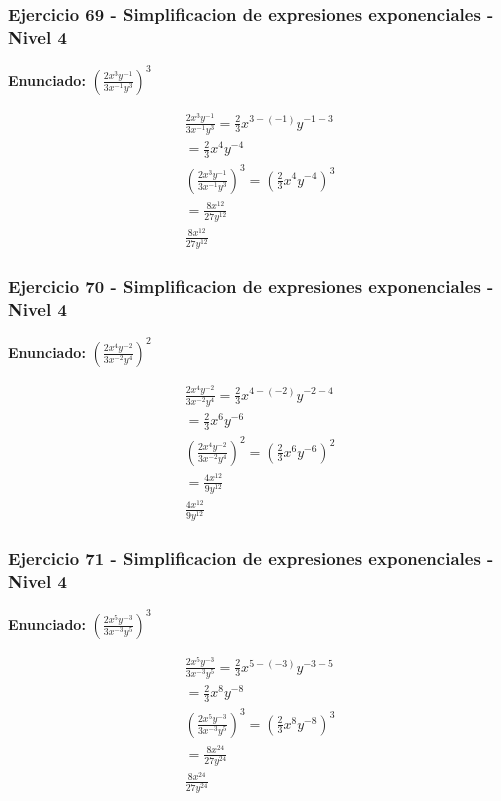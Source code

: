 \documentclass[12pt,a4paper]{article}
\begin{document}
\subsubsection*{Ejercicio 69 - Simplificacion de expresiones exponenciales - Nivel 4}
\textbf{Enunciado:} \(\left(\frac{2x^{3}y^{-1}}{3x^{-1}y^{3}}\right)^{3}\)

\[
\begin{aligned}
\frac{2x^{3}y^{-1}}{3x^{-1}y^{3}}=\frac{2}{3}x^{3-(-1)}y^{-1-3}\\
=\frac{2}{3}x^{4}y^{-4}\\
\left(\frac{2x^{3}y^{-1}}{3x^{-1}y^{3}}\right)^{3}=\left(\frac{2}{3}x^{4}y^{-4}\right)^{3}\\
=\frac{8x^{12}}{27y^{12}}\\
\boxed{\frac{8x^{12}}{27y^{12}}}
\end{aligned}
\]


\subsubsection*{Ejercicio 70 - Simplificacion de expresiones exponenciales - Nivel 4}
\textbf{Enunciado:} \(\left(\frac{2x^{4}y^{-2}}{3x^{-2}y^{4}}\right)^{2}\)

\[
\begin{aligned}
\frac{2x^{4}y^{-2}}{3x^{-2}y^{4}}=\frac{2}{3}x^{4-(-2)}y^{-2-4}\\
=\frac{2}{3}x^{6}y^{-6}\\
\left(\frac{2x^{4}y^{-2}}{3x^{-2}y^{4}}\right)^{2}=\left(\frac{2}{3}x^{6}y^{-6}\right)^{2}\\
=\frac{4x^{12}}{9y^{12}}\\
\boxed{\frac{4x^{12}}{9y^{12}}}
\end{aligned}
\]


\subsubsection*{Ejercicio 71 - Simplificacion de expresiones exponenciales - Nivel 4}
\textbf{Enunciado:} \(\left(\frac{2x^{5}y^{-3}}{3x^{-3}y^{5}}\right)^{3}\)

\[
\begin{aligned}
\frac{2x^{5}y^{-3}}{3x^{-3}y^{5}}=\frac{2}{3}x^{5-(-3)}y^{-3-5}\\
=\frac{2}{3}x^{8}y^{-8}\\
\left(\frac{2x^{5}y^{-3}}{3x^{-3}y^{5}}\right)^{3}=\left(\frac{2}{3}x^{8}y^{-8}\right)^{3}\\
=\frac{8x^{24}}{27y^{24}}\\
\boxed{\frac{8x^{24}}{27y^{24}}}
\end{aligned}
\]
\end{document}
